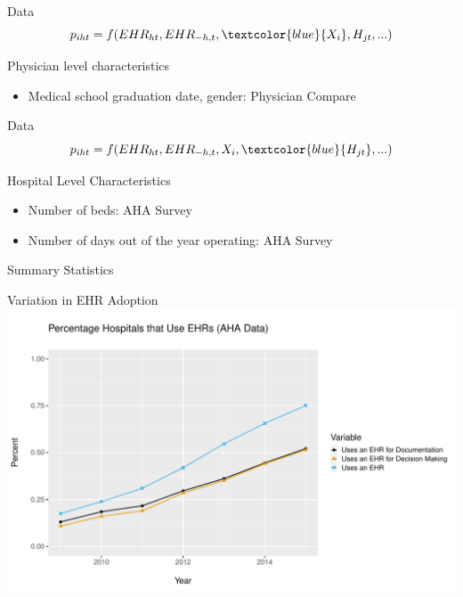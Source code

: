 \documentclass[10pt]{beamer}
\begin{document}
\begin{frame}[noframenumbering]{Data}
\begin{equation*}
    p_{iht}=f(EHR_{ht},EHR_{-h,t},\textcolor{blue}{X_i},H_{jt},...)
\end{equation*}

\vspace{5mm}

Physician level characteristics
\begin{itemize}
    \item Medical school graduation date, gender: Physician Compare
\end{itemize}
\end{frame}

\begin{frame}[noframenumbering]{Data}
\begin{equation*}
    p_{iht}=f(EHR_{ht},EHR_{-h,t},X_i,\textcolor{blue}{H_{jt}},...)
\end{equation*}

\vspace{5mm}

Hospital Level Characteristics
\begin{itemize}
    \item Number of beds: AHA Survey
    \item Number of days out of the year operating: AHA Survey
\end{itemize}
\end{frame}

\begin{frame}{Summary Statistics}

\end{frame}

\begin{frame}{Variation in EHR Adoption}
\centering
\includegraphics[scale=.55]{Objects/TYP_plot_hospEHR_year.pdf}
\end{frame}
\end{document}
